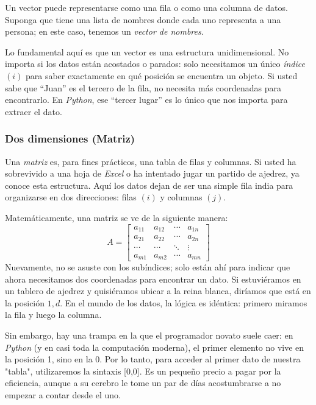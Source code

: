Un vector puede representarse como una fila o como una columna de datos. Suponga que tiene una lista de nombres donde cada uno representa a una persona; en este caso, tenemos un \textit{vector de nombres}.

Lo fundamental aquí es que un vector es una estructura unidimensional. No importa si los datos están acostados o parados: solo necesitamos un único \textit{índice} \((i)\) para saber exactamente en qué posición se encuentra un objeto. Si usted sabe que ``Juan'' es el tercero de la fila, no necesita más coordenadas para encontrarlo. En \textit{Python}, ese ``tercer lugar'' es lo único que nos importa para extraer el dato.


\subsubsection{Dos dimensiones (Matriz)}

Una \textit{matriz} es, para fines prácticos, una tabla de filas y columnas. Si usted ha sobrevivido a una hoja de \textit{Excel} o ha intentado jugar un partido de ajedrez, ya conoce esta estructura. Aquí los datos dejan de ser una simple fila india para organizarse en dos direcciones: filas \((i)\) y columnas \((j)\).

Matemáticamente, una matriz se ve de la siguiente manera:
\[
A = \begin{bmatrix}
a_{11} & a_{12} & \cdots & a_{1n} \\
a_{21} & a_{22} & \cdots & a_{2n} \\
\cdots  & \cdots  & \ddots & \vdots\\
a_{m1} & a_{m2} & \cdots & a_{mn}
\end{bmatrix}
\]
Nuevamente, no se asuste con los subíndices; solo están ahí para indicar que ahora necesitamos dos coordenadas para encontrar un dato. Si estuviéramos en un tablero de ajedrez y quisiéramos ubicar a la reina blanca, diríamos que está en la posición \(1,d\). En el mundo de los datos, la lógica es idéntica: primero miramos la fila y luego la columna.

Sin embargo, hay una trampa en la que el programador novato suele caer: en \textit{Python} (y en casi toda la computación moderna), el primer elemento no vive en la posición 1, sino en la 0. Por lo tanto, para acceder al primer dato de nuestra "tabla", utilizaremos la sintaxis [0,0]. Es un pequeño precio a pagar por la eficiencia, aunque a su cerebro le tome un par de días acostumbrarse a no empezar a contar desde el uno.


